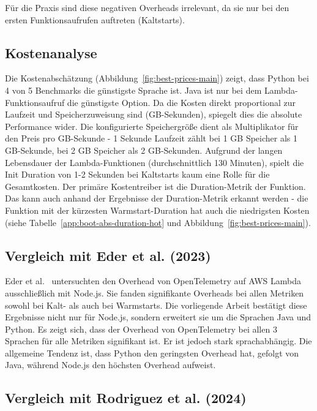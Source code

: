 Für die Praxis sind diese negativen Overheads irrelevant, da sie nur bei den ersten Funktionsaufrufen 
auftreten (Kaltstarts).

\subsection{Kostenanalyse}
\label{subsec:kosten-analyse}
Die Kostenabschätzung (Abbildung~\ref{fig:best-prices-main}) zeigt, dass Python bei 4 von 5 Benchmarks die günstigste Sprache ist. 
Java ist nur bei dem Lambda-Funktionsaufruf die günstigste Option. Da die Kosten direkt proportional zur Laufzeit und Speicherzuweisung sind (GB-Sekunden), 
spiegelt dies die absolute Performance wider. Die konfigurierte Speichergröße dient als Multiplikator für den Preis pro GB-Sekunde - 
1 Sekunde Laufzeit zählt bei 1 GB Speicher als 1 GB-Sekunde, bei 2 GB Speicher als 2 GB-Sekunden. Aufgrund der langen Lebensdauer der 
Lambda-Funktionen (durchschnittlich 130 Minuten), spielt die Init Duration von 1-2 Sekunden bei Kaltstarts kaum eine Rolle für die Gesamtkosten. 
Der primäre Kostentreiber ist die Duration-Metrik der Funktion. Das kann auch anhand der Ergebnisse der Duration-Metrik erkannt werden - 
die Funktion mit der kürzesten Warmstart-Duration hat auch die niedrigsten Kosten (siehe Tabelle~\ref{app:boot-abs-duration-hot} und Abbildung~\ref{fig:best-prices-main}).

\subsection{Vergleich mit Eder et al. (2023)}

Eder et al.~\cite{10254754} untersuchten den Overhead von OpenTelemetry auf AWS Lambda ausschließlich mit Node.js. Sie fanden 
signifikante Overheads bei allen Metriken sowohl bei Kalt- als auch bei Warmstarts. Die vorliegende Arbeit bestätigt diese Ergebnisse 
nicht nur für Node.js, sondern erweitert sie um die Sprachen Java und Python. Es zeigt sich, dass der Overhead von OpenTelemetry 
bei allen 3 Sprachen für alle Metriken signifikant ist. Er ist jedoch stark sprachabhängig. Die allgemeine Tendenz ist, dass 
Python den geringsten Overhead hat, gefolgt von Java, während Node.js den höchsten Overhead aufweist. 

\subsection{Vergleich mit Rodriguez et al. (2024)}

